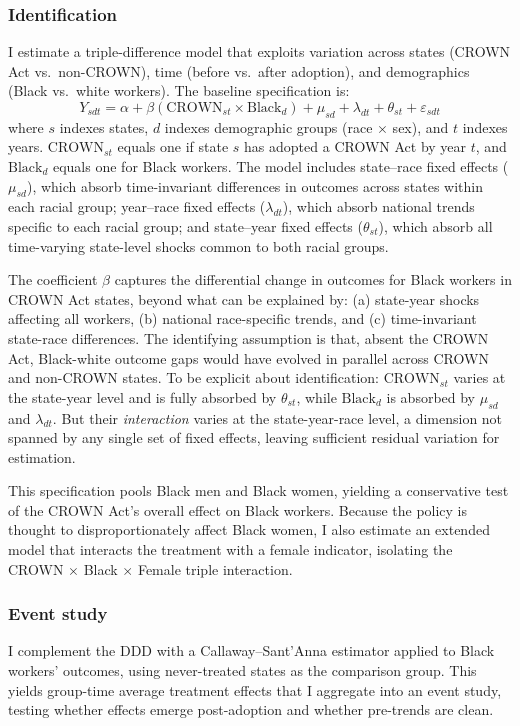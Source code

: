 \documentclass[12pt]{article}
\begin{document}
\subsubsection*{Identification} I estimate a triple-difference model that exploits variation across states (CROWN Act vs.\ non-CROWN), time (before vs.\ after adoption), and demographics (Black vs.\ white workers). The baseline specification is:
\begin{equation}
Y_{sdt} = \alpha + \beta (\text{CROWN}_{st} \times \text{Black}_d) + \mu_{sd} + \lambda_{dt} + \theta_{st} + \varepsilon_{sdt}
\label{eq:ddd}
\end{equation}
where $s$ indexes states, $d$ indexes demographic groups (race $\times$ sex), and $t$ indexes years. $\text{CROWN}_{st}$ equals one if state $s$ has adopted a CROWN Act by year $t$, and $\text{Black}_d$ equals one for Black workers. The model includes state--race fixed effects ($\mu_{sd}$), which absorb time-invariant differences in outcomes across states within each racial group; year--race fixed effects ($\lambda_{dt}$), which absorb national trends specific to each racial group; and state--year fixed effects ($\theta_{st}$), which absorb all time-varying state-level shocks common to both racial groups.

The coefficient $\beta$ captures the differential change in outcomes for Black workers in CROWN Act states, beyond what can be explained by: (a) state-year shocks affecting all workers, (b) national race-specific trends, and (c) time-invariant state-race differences. The identifying assumption is that, absent the CROWN Act, Black-white outcome gaps would have evolved in parallel across CROWN and non-CROWN states. To be explicit about identification: $\text{CROWN}_{st}$ varies at the state-year level and is fully absorbed by $\theta_{st}$, while $\text{Black}_d$ is absorbed by $\mu_{sd}$ and $\lambda_{dt}$. But their \textit{interaction} varies at the state-year-race level, a dimension not spanned by any single set of fixed effects, leaving sufficient residual variation for estimation.

This specification pools Black men and Black women, yielding a conservative test of the CROWN Act's overall effect on Black workers. Because the policy is thought to disproportionately affect Black women, I also estimate an extended model that interacts the treatment with a female indicator, isolating the CROWN $\times$ Black $\times$ Female triple interaction.

\subsubsection*{Event study} I complement the DDD with a Callaway--Sant'Anna estimator \citep{callaway_santanna_2021} applied to Black workers' outcomes, using never-treated states as the comparison group. This yields group-time average treatment effects that I aggregate into an event study, testing whether effects emerge post-adoption and whether pre-trends are clean.
\end{document}
